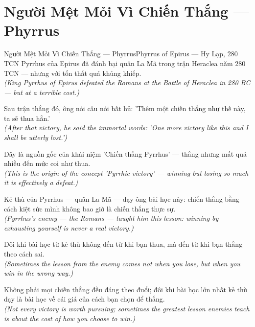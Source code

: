 \section{Người Mệt Mỏi Vì Chiến Thắng --- Phyrrus}
\begin{truyen}{Người Mệt Mỏi Vì Chiến Thắng --- Phyrrus}{Phyrrus of Epirus --- Hy Lạp, 280 TCN}
 Pyrrhus của Epirus đã đánh bại quân La Mã trong trận Heraclea năm 280 TCN --- nhưng với tổn thất quá khủng khiếp.\\[4pt]
\textit{(King Pyrrhus of Epirus defeated the Romans at the Battle of Heraclea in 280 BC --- but at a terrible cost.)}

Sau trận thắng đó, ông nói câu nói bất hủ: 'Thêm một chiến thắng như thế này, ta sẽ thua hẳn.'\\[4pt]
\textit{(After that victory, he said the immortal words: 'One more victory like this and I shall be utterly lost.')}

Đây là nguồn gốc của khái niệm 'Chiến thắng Pyrrhus' --- thắng nhưng mất quá nhiều đến mức coi như thua.\\[4pt]
\textit{(This is the origin of the concept 'Pyrrhic victory' --- winning but losing so much it is effectively a defeat.)}

Kẻ thù của Pyrrhus --- quân La Mã --- dạy ông bài học này: chiến thắng bằng cách kiệt sức mình không bao giờ là chiến thắng thực sự.\\[4pt]
\textit{(Pyrrhus's enemy --- the Romans --- taught him this lesson: winning by exhausting yourself is never a real victory.)}

Đôi khi bài học từ kẻ thù không đến từ khi bạn thua, mà đến từ khi bạn thắng theo cách sai.\\[4pt]
\textit{(Sometimes the lesson from the enemy comes not when you lose, but when you win in the wrong way.)}

\end{truyen}
\begin{baihoc}
  Không phải mọi chiến thắng đều đáng theo đuổi; đôi khi bài học lớn nhất kẻ thù dạy là bài học về cái giá của cách bạn chọn để thắng.\\[4pt]
  \textit{(Not every victory is worth pursuing; sometimes the greatest lesson enemies teach is about the cost of how you choose to win.)}
\end{baihoc}

